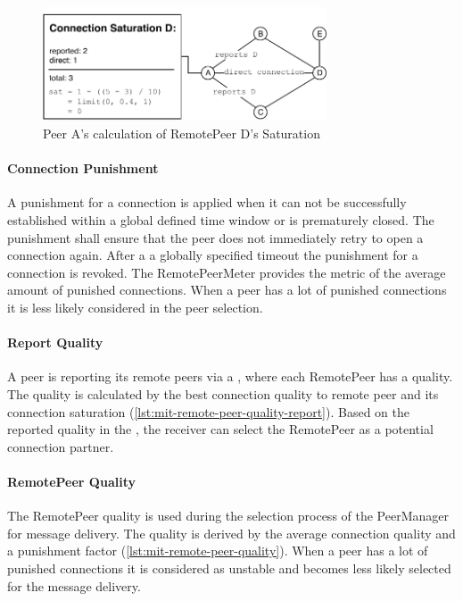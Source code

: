 \begin{figure}
\centering
\includegraphics[width=0.75\textwidth]{graphics/implementation/mitosis-architecture-Connection-Saturation.pdf}
\caption{Peer A's calculation of RemotePeer D's Saturation }
\label{fig:mit-remote-peer-saturation}
\end{figure}

\paragraph{Connection Punishment}
A punishment for a connection is applied when it can not be successfully established within a global defined time window or is prematurely closed. The punishment shall ensure that the peer does not immediately retry to open a connection again. After a a globally specified timeout the punishment for a connection is revoked.
The RemotePeerMeter provides the metric of the average amount of punished connections. When a peer has a lot of punished connections it is less likely considered in the peer selection.

\paragraph{Report Quality}\label{par:mit-report-quality}
A peer is reporting its remote peers via a \peerUpdate, where each RemotePeer has a quality. The quality is calculated by the best connection quality to remote peer and its connection saturation (\vref{lst:mit-remote-peer-quality-report}). Based on the reported quality in the \peerUpdate, the receiver can select the RemotePeer as a potential connection partner. 

\paragraph{RemotePeer Quality}
The RemotePeer quality is used during the selection process of the PeerManager for message delivery. The quality is derived by the average connection quality and a punishment factor (\vref{lst:mit-remote-peer-quality}). When a peer has a lot of punished connections it is considered as unstable and becomes less likely selected for the message delivery.


